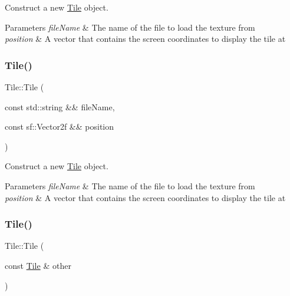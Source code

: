 Construct a new \mbox{\hyperlink{classRose_1_1Tile}{Tile}} object. 


\begin{DoxyParams}{Parameters}
{\em file\+Name} & The name of the file to load the texture from \\
\hline
{\em position} & A vector that contains the screen coordinates to display the tile at \\
\hline
\end{DoxyParams}
\mbox{\label{classRose_1_1Tile_a6583b7a8d50b38d972865eb3440251fc}} 
\subsubsection{\texorpdfstring{Tile()}{Tile()}\hspace{0.1cm}{\footnotesize\ttfamily [2/3]}}
{\footnotesize\ttfamily Tile\+::\+Tile (\begin{DoxyParamCaption}\item[{const std\+::string \&\&}]{file\+Name,  }\item[{const sf\+::\+Vector2f \&\&}]{position }\end{DoxyParamCaption})\hspace{0.3cm}{\ttfamily [explicit]}}



Construct a new \mbox{\hyperlink{classRose_1_1Tile}{Tile}} object. 


\begin{DoxyParams}{Parameters}
{\em file\+Name} & The name of the file to load the texture from \\
\hline
{\em position} & A vector that contains the screen coordinates to display the tile at \\
\hline
\end{DoxyParams}
\mbox{\label{classRose_1_1Tile_a480e50775203166df068f0cfc889d91b}} 
\subsubsection{\texorpdfstring{Tile()}{Tile()}\hspace{0.1cm}{\footnotesize\ttfamily [3/3]}}
{\footnotesize\ttfamily Tile\+::\+Tile (\begin{DoxyParamCaption}\item[{const \mbox{\hyperlink{classRose_1_1Tile}{Tile}} \&}]{other }\end{DoxyParamCaption})}




